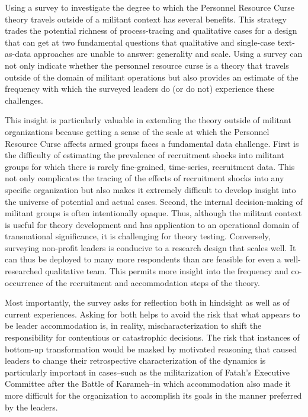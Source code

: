 Using a survey to investigate the degree to which the Personnel Resource Curse theory travels outside of a militant context has several benefits. This strategy trades the potential richness of process-tracing and qualitative cases for a design that can get at two fundamental questions that qualitative and single-case text-as-data approaches are unable to answer: generality and scale. Using a survey can not only indicate whether the personnel resource curse is a theory that travels outside of the domain of militant operations but also provides an estimate of the frequency with which the surveyed leaders do (or do not) experience these challenges.

This insight is particularly valuable in extending the theory outside of militant organizations because getting a sense of the scale at which the Personnel Resource Curse affects armed groups faces a fundamental data challenge. First is the difficulty of estimating the prevalence of recruitment shocks into militant groups for which there is rarely fine-grained, time-series, recruitment data. This not only complicates the tracing of the effects of recruitment shocks into any specific organization but also makes it extremely difficult to develop insight into the universe of potential and actual cases. Second, the internal decision-making of militant groups is often intentionally opaque. Thus, although the militant context is useful for theory development and has application to an operational domain of transnational significance, it is challenging for theory testing.  Conversely, surveying non-profit leaders is conducive to a research design that scales well. It can thus be deployed to many more respondents than are feasible for even a well-researched qualitative team. This permits more insight into the frequency and co-occurrence of the recruitment and accommodation steps of the theory.

Most importantly, the survey asks for reflection both in hindsight as well as of current experiences.  Asking for both helps to avoid the risk that what appears to be leader accommodation is, in reality, mischaracterization to shift the responsibility for contentious or catastrophic decisions.  The risk that instances of bottom-up transformation would be masked by motivated reasoning that caused leaders to change their retrospective characterization of the dynamics is particularly important in cases--such as the militarization of Fatah's Executive Committee after the Battle of Karameh--in which accommodation also made it more difficult for the organization to accomplish its goals in the manner preferred by the leaders.



